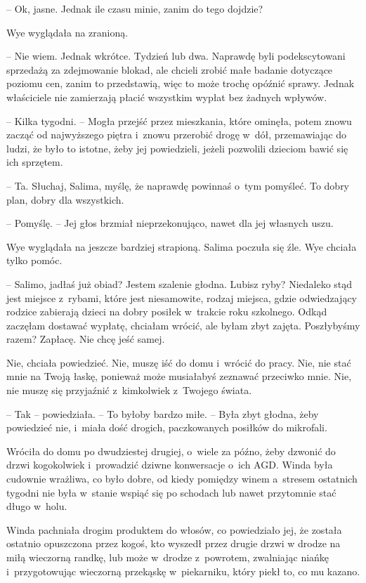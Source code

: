 \documentclass[oneside,polish,11pt,sfheadings]{mwbk}
\begin{document}
-- Ok, jasne. Jednak ile czasu minie, zanim do tego dojdzie?

Wye wyglądała na zranioną. 

-- Nie wiem. Jednak wkrótce. Tydzień lub dwa.
Naprawdę byli podekscytowani sprzedażą za zdejmowanie blokad, ale
chcieli zrobić małe badanie dotyczące poziomu cen, zanim to przedstawią,
więc to może trochę opóźnić sprawy. Jednak właściciele nie zamierzają
płacić wszystkim wypłat bez żadnych wpływów.

-- Kilka tygodni. -- Mogła przejść przez mieszkania, które ominęła, potem
znowu zacząć od najwyższego piętra i~znowu przerobić drogę w~dół,
przemawiając do ludzi, że było to istotne, żeby jej powiedzieli, jeżeli
pozwolili dzieciom bawić się ich sprzętem.

-- Ta. Słuchaj, Salima, myślę, że naprawdę powinnaś o~tym pomyśleć. To
dobry plan, dobry dla wszystkich.

-- Pomyślę. -- Jej głos brzmiał nieprzekonująco, nawet dla jej własnych
uszu.

Wye wyglądała na jeszcze bardziej strapioną. Salima poczuła się źle. Wye
chciała tylko pomóc.

-- Salimo, jadłaś już obiad? Jestem szalenie głodna. Lubisz ryby?
Niedaleko stąd jest miejsce z~rybami, które jest niesamowite, rodzaj
miejsca, gdzie odwiedzający rodzice zabierają dzieci na dobry posiłek w~trakcie roku szkolnego. Odkąd zaczęłam dostawać wypłatę, chciałam
wrócić, ale byłam zbyt zajęta. Poszłybyśmy razem? Zapłacę. Nie chcę jeść
samej.

Nie, chciała powiedzieć. Nie, muszę iść do domu i~wrócić do pracy. Nie,
nie stać mnie na Twoją łaskę, ponieważ może musiałabyś zeznawać
przeciwko mnie. Nie, nie muszę się przyjaźnić z~kimkolwiek z~Twojego
świata.

-- Tak -- powiedziała. -- To byłoby bardzo miłe. -- Była zbyt głodna, żeby
powiedzieć nie, i~miała dość drogich, paczkowanych posiłków do
mikrofali.

Wróciła do domu po dwudziestej drugiej, o~wiele za późno, żeby dzwonić
do drzwi kogokolwiek i~prowadzić dziwne konwersacje o~ich AGD. Winda
była cudownie wrażliwa, co było dobre, od kiedy pomiędzy winem a~stresem
ostatnich tygodni nie była w~stanie wspiąć się po schodach lub nawet
przytomnie stać długo w~holu.

Winda pachniała drogim produktem do włosów, co powiedziało jej, że
została ostatnio opuszczona przez kogoś, kto wyszedł przez drugie drzwi
w drodze na miłą wieczorną randkę, lub może w~drodze z~powrotem,
zwalniając niańkę i~przygotowując wieczorną przekąskę w~piekarniku,
który piekł to, co mu kazano.
\end{document}
